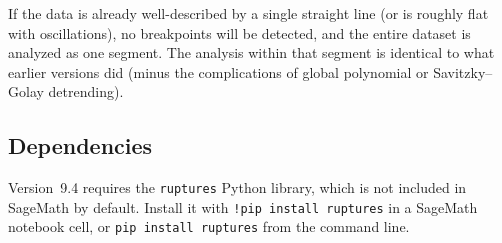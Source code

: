 \documentclass[11pt]{article}
\newcommand{\code}[1]{\texttt{#1}}
\begin{document}
If the data is already well-described by a single straight line (or is
roughly flat with oscillations), no breakpoints will be detected, and the
entire dataset is analyzed as one segment.  The analysis within that
segment is identical to what earlier versions did (minus the complications
of global polynomial or Savitzky--Golay detrending).

\subsection*{Dependencies}

Version~9.4 requires the \code{ruptures} Python library, which is not
included in SageMath by default.  Install it with
\code{!pip install ruptures} in a SageMath notebook cell, or
\code{pip install ruptures} from the command line.
\end{document}
